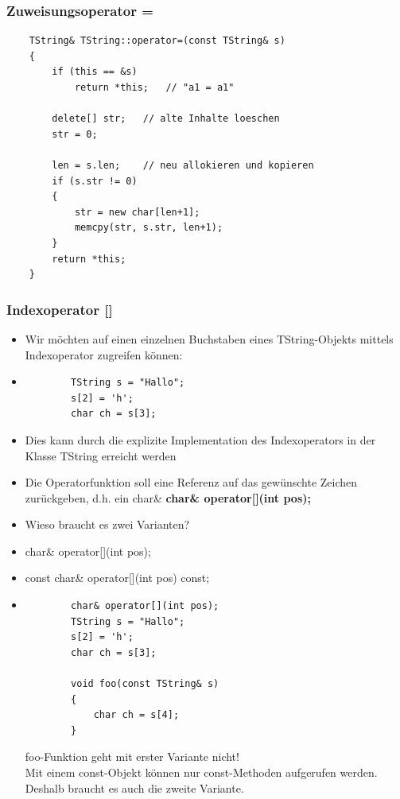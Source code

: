 \subsubsection{Zuweisungsoperator =}
\label{sec:zuweisungsoperator}
\noindent
\begin{minipage}{\linewidth}
	\begin{lstlisting}
	TString& TString::operator=(const TString& s)
	{
		if (this == &s)
			return *this;	// "a1 = a1"
		
		delete[] str;	// alte Inhalte loeschen
		str = 0;
		
		len = s.len;	// neu allokieren und kopieren
		if (s.str != 0)
		{
			str = new char[len+1];
			memcpy(str, s.str, len+1);
		}
		return *this;
	}
	\end{lstlisting}
\end{minipage}

\subsubsection{Indexoperator []}
\begin{itemize}
	\item Wir möchten auf einen einzelnen Buchstaben eines TString-Objekts mittels Indexoperator 	zugreifen können:
	\noindent
	\item[\-]\vspace{-\baselineskip}\begin{minipage}{\linewidth}
		\begin{lstlisting}
		TString s = "Hallo";
		s[2] = 'h';
		char ch = s[3];
		\end{lstlisting}
	\end{minipage}
	\item Dies kann durch die explizite Implementation des Indexoperators in der Klasse TString erreicht werden
	\item Die Operatorfunktion soll eine Referenz auf das gewünschte Zeichen zurückgeben, d.h. ein char\&
	\subitem \textbf{char\& operator[](int pos);}
	\item Wieso braucht es zwei Varianten?
	\item[\-] char\& operator[](int pos);
	\item[\-] const char\& operator[](int pos) const;
	\noindent
	\item[\-]\vspace{-\baselineskip}\begin{minipage}{\linewidth}
		\begin{lstlisting}
		char& operator[](int pos);
		TString s = "Hallo";
		s[2] = 'h';
		char ch = s[3];
		
		void foo(const TString& s)	
		{
			char ch = s[4];
		}
		\end{lstlisting}
		\color{red}foo-Funktion geht mit erster Variante nicht!\color{black}\\Mit einem const-Objekt können nur const-Methoden aufgerufen werden. Deshalb braucht es auch die zweite Variante.
	\end{minipage}
\end{itemize}

